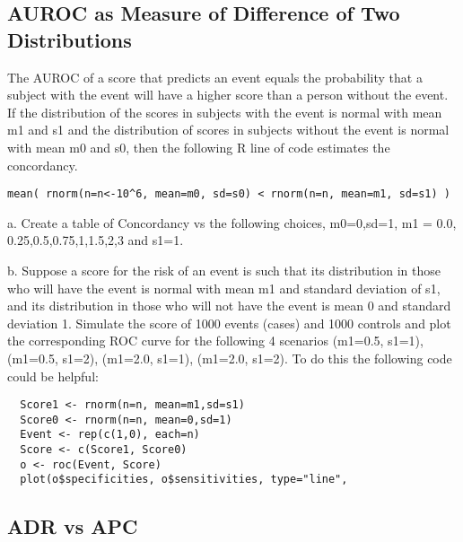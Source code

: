\documentclass[12pt]{article}
\begin{document}
\subsection{AUROC as Measure of Difference of Two Distributions}

The AUROC of a score that predicts an event equals the probability that a subject with the event will have a higher score than a person without the event. If the distribution of the scores in subjects with the event is normal with mean m1 and s1 and the distribution of scores in subjects without the event is normal with mean m0 and s0, then the following R line of code estimates the concordancy.
\begin{spacing}{1.0}
\begin{lstlisting}
mean( rnorm(n=n<-10^6, mean=m0, sd=s0) < rnorm(n=n, mean=m1, sd=s1) )
\end{lstlisting}
\end{spacing}

a. Create a table of Concordancy vs the following choices, m0=0,sd=1, m1 = 0.0, 0.25,0.5,0.75,1,1.5,2,3 and s1=1.

b. Suppose a score for the risk of an event is such that its distribution in those who will have the event is normal with mean m1 and standard deviation of s1, and its distribution in those who will not have the event is mean 0 and standard deviation 1. Simulate the score of 1000 events (cases)  and 1000 controls and plot the corresponding ROC curve for the following 4 scenarios (m1=0.5, s1=1), (m1=0.5, s1=2), (m1=2.0, s1=1), (m1=2.0, s1=2). To do this the following code could be helpful:
\begin{spacing}{1.0}
\begin{lstlisting}  
  Score1 <- rnorm(n=n, mean=m1,sd=s1)
  Score0 <- rnorm(n=n, mean=0,sd=1)
  Event <- rep(c(1,0), each=n)
  Score <- c(Score1, Score0)
  o <- roc(Event, Score)
  plot(o$specificities, o$sensitivities, type="line", 
\end{lstlisting}
\end{spacing}

 

\subsection{ADR vs APC}
\end{document}
